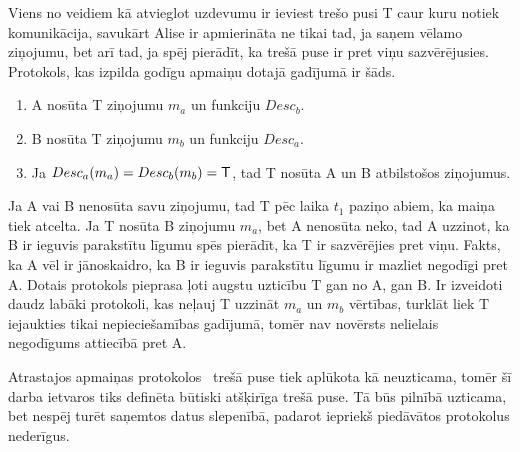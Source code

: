 Viens no veidiem kā atvieglot uzdevumu ir ieviest trešo pusi T caur kuru notiek komunikācija, savukārt Alise ir apmierināta ne tikai tad, ja saņem vēlamo ziņojumu, bet arī tad, ja spēj pierādīt, ka trešā puse ir pret viņu sazvērējusies.
Protokols, kas izpilda godīgu apmaiņu dotajā gadījumā ir šāds.
\begin{enumerate}
    \item A nosūta T ziņojumu $m_a$ un funkciju $Desc_b$.
    \item B nosūta T ziņojumu $m_b$ un funkciju $Desc_a$.
    \item Ja $Desc_a(m_a) = Desc_b(m_b) = \textsf{T}$, tad T nosūta A un B atbilstošos ziņojumus.
\end{enumerate}
Ja A vai B nenosūta savu ziņojumu, tad T pēc laika $t_1$ paziņo abiem, ka maiņa tiek atcelta. Ja T nosūta B ziņojumu $m_a$, bet A nenosūta neko, tad A uzzinot, ka B ir ieguvis parakstītu līgumu spēs pierādīt, ka T ir sazvērējies pret viņu. Fakts, ka A vēl ir jānoskaidro, ka B ir ieguvis parakstītu līgumu ir mazliet negodīgi pret A. Dotais protokols pieprasa ļoti augstu uzticību T gan no A, gan B. Ir izveidoti daudz labāki protokoli, kas neļauj T uzzināt $m_a$ un $m_b$ vērtības, turklāt liek T iejaukties tikai nepieciešamības gadījumā, tomēr nav novērsts nelielais negodīgums attiecībā pret A.\cite{asokan98}

Atrastajos apmaiņas protokolos~\cite{asokan98,schunter00}%
trešā puse tiek aplūkota kā neuzticama, tomēr šī darba ietvaros tiks definēta būtiski atšķirīga trešā puse. Tā būs pilnībā uzticama, bet nespēj turēt saņemtos datus slepenībā, padarot iepriekš piedāvātos protokolus nederīgus.

